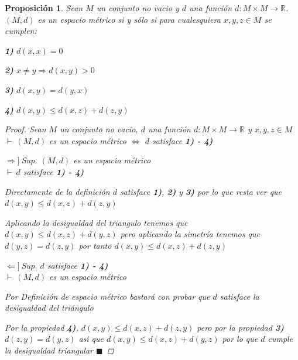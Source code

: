 \documentclass[oneside]{book} %
\theoremstyle{Teorema}
\newtheorem{Proposicion}[Definicion]{Proposición}
\theoremstyle{Ejemplos}
\theoremstyle{[Obs]}
\renewcommand{\{}{\left\lbrace} %
\renewcommand{\}}{\right\rbrace} %
\newcommand{\R}{\mathbb{R}} %
\renewcommand{\qed}{$\blacksquare$} %
\newcommand{\pd}{$\vdash\ $} %
\newcommand{\necesidad}{$\Rightarrow]\ $} %
\newcommand{\suficiencia}{$\Leftarrow]\ $} %
\begin{document}
			\begin{Proposicion}\setlength{\parindent}{0em}

				Sean $M$ un conjunto no vacio y $d$ una función $d : M \times M \to \R$. $(M, d)$ es un espacio métrico si y sólo si para cualesquiera $x, y, z \in M$ se cumplen: 

				\textbf{1)} $d(x, x) = 0$ 

				\textbf{2)} $x \neq y \Rightarrow d(x, y) > 0$
				
				\textbf{3)} $d(x, y) = d(y, x)$ 

				\textbf{4)} $d(x, y) \leq d(x, z) + d(z, y)$

				\begin{proof}
					
					Sean $M$ un conjunto no vacio, $d$ una función $d : M \times M \to \R$ y $x, y, z \in M$ \\
					\pd $(M, d)$ es un espacio métrico $\Leftrightarrow$ $d$ satisface \textbf{1) - 4)}

					\necesidad Sup. $(M, d)$ es un espacio métrico \\
					\pd $d$ satisface \textbf{1) - 4)}

					Directamente de la definición $d$ satisface \textbf{1)}, \textbf{2)} y \textbf{3)} por lo que resta ver que $d(x, y) \leq d(x, z) + d(z, y)$
					
					Aplicando la desigualdad del triangulo tenemos que $d(x, y) \leq d(x, z) + d(y, z)$ pero aplicando la simetría tenemos que $d(y, z) = d(z, y)$ por tanto $d(x, y) \leq d(x, z) + d(z, y)$

					\suficiencia Sup. $d$ satisface \textbf{1) - 4)} \\
					\pd $(M, d)$ es un espacio métrico

					Por Definición de espacio métrico bastará con probar que $d$ satisface la desigualdad del triángulo
					
					Por la propiedad \textbf{4)}, $d(x, y) \leq d(x, z) + d(z, y)$ pero por la propiedad \textbf{3)} $d(z, y) = d(y, z)$ asi que $d(x, y) \leq d(x, z) + d(y, z)$ por lo que $d$ cumple la desigualdad triangular \qed

				\end{proof}

			\end{Proposicion}
\end{document}
